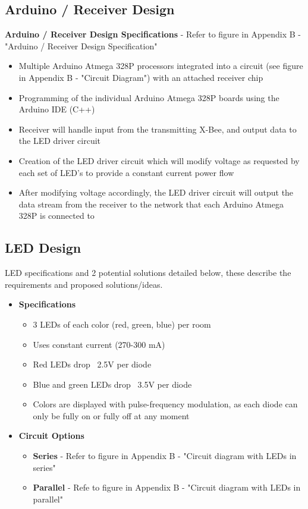 \documentclass[12pt]{article}
\begin{document}
{		
			\subsection{Arduino / Receiver Design}
				
				\textbf{Arduino / Receiver Design Specifications} - Refer to figure in Appendix B - "Arduino / Receiver Design Specification"
				\begin{itemize}
					\item Multiple Arduino Atmega 328P processors integrated into a circuit (see figure in Appendix B - "Circuit Diagram") with an attached receiver chip
					\item Programming of the individual Arduino Atmega 328P boards using the Arduino IDE (C++)
					\item Receiver will handle input from the transmitting X-Bee, and output data to the LED driver circuit
					\item Creation of the LED driver circuit which will modify voltage as requested by each set of LED’s to provide a constant current power flow
					\item After modifying voltage accordingly, the LED driver circuit will output the data stream from the receiver to the network that each Arduino Atmega 328P is connected to
				\end{itemize}
			
			\subsection{LED Design}
				LED specifications and 2 potential solutions detailed below, these describe the requirements and proposed solutions/ideas.
				
				{\renewcommand\labelitemi{}
					\begin{itemize}
						\item \textbf{Specifications}
						\begin{itemize}
							\item 3 LEDs of each color (red, green, blue) per room
							\item Uses constant current (270-300 mA)
							\item Red LEDs drop ~2.5V per diode
							\item Blue and green LEDs drop ~3.5V per diode
							\item Colors are displayed with pulse-frequency modulation, as each diode can only be fully on or fully off at any moment
						\end{itemize}
						\item \textbf{Circuit Options}
						\begin{itemize}
							\item \textbf{Series} - Refer to figure in Appendix B - "Circuit diagram with LEDs in series"
							\item \textbf{Parallel} - Refe to figure in Appendix B - "Circuit diagram with LEDs in parallel"
						\end{itemize}
					\end{itemize}
				
}}
\end{document}
